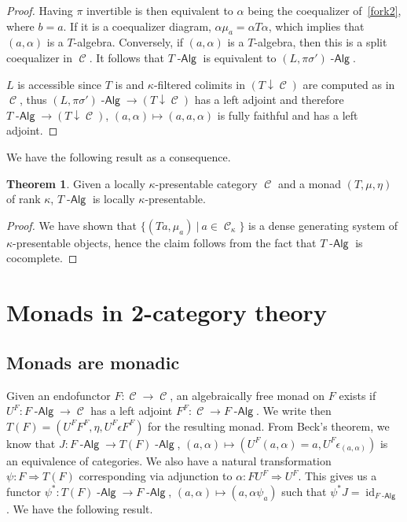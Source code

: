 \documentclass[a4paper,11pt,oneside,openany]{scrbook}
\DeclareMathOperator{\Alg}{-\mathsf{Alg}}
\DeclareMathOperator{\C}{\mathcal{C}}
\DeclareMathOperator{\id}{id}
\theoremstyle{definition}
\newtheorem{thm}{Theorem}[section] %
\theoremstyle{definition}
\begin{document}
\begin{proof}
    Having $\pi$ invertible is then equivalent to $\alpha$ being the coequalizer of~\ref{fork2}, where $b=a$. If it is a coequalizer diagram, $\alpha\mu_a=\alpha T\alpha$, which implies that $(a,\alpha)$ is a $T$-algebra. Conversely, if $(a,\alpha)$ is a $T$-algebra, then this is a split coequalizer in $\C$. It follows that $T\Alg$ is equivalent to $(L,\pi\sigma')\Alg$.
    
    $L$ is accessible since $T$ is and $\kappa$-filtered colimits in $(T\downarrow\C)$ are computed as in $\C$, thus $(L,\pi\sigma')\Alg\rightarrow(T\downarrow\C)$ has a left adjoint and therefore $T\Alg\rightarrow (T\downarrow\C)$, $(a,\alpha)\mapsto(a,a,\alpha)$ is fully faithful and has a left adjoint.
\end{proof}

We have the following result as a consequence.

\begin{thm}
    Given a locally $\kappa$-presentable category $\C$ and a monad $(T,\mu,\eta)$ of rank $\kappa$, $T\Alg$ is locally $\kappa$-presentable.
\end{thm}

\begin{proof}
    We have shown that $\{(Ta,\mu_a)\ |\ a\in\C_\kappa\}$ is a dense generating system of $\kappa$-presentable objects, hence the claim follows from the fact that $T\Alg$ is cocomplete.
\end{proof}

\chapter{Monads in 2-category theory}

\section{Monads are monadic}

Given an endofunctor $F\colon\C\rightarrow\C$, an algebraically free monad on $F$ exists if $U^F\colon F\Alg\rightarrow\C$ has a left adjoint $F^F\colon\C\rightarrow F\Alg$. We write then $T(F)=(U^FF^F,\eta,U^F\epsilon F^F)$ for the resulting monad. From Beck's theorem, we know that $J\colon F\Alg\rightarrow T(F)\Alg$, $(a,\alpha)\mapsto (U^F(a,\alpha)=a,U^F\epsilon_{(a,\alpha)})$ is an equivalence of categories. We also have a natural transformation $\psi\colon F\Rightarrow T(F)$ corresponding via adjunction to $\alpha\colon FU^F\Rightarrow U^F$. This gives us a functor $\psi^*\colon T(F)\Alg\rightarrow F\Alg$, $(a,\alpha)\mapsto (a,\alpha\psi_a)$ such that $\psi^* J=\id_{F\Alg}$. We have the following result.
\end{document}

